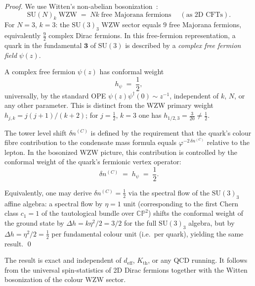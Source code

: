 \documentclass[11pt,a4paper]{article}
\theoremstyle{definition}
\theoremstyle{remark}
\newcommand{\vp}{\varphi}
\newcommand{\deff}{d_{\mathrm{eff}}}
\begin{document}
\begin{proof}
We use Witten's non-abelian bosonization~\cite{Witten1984}:
\begin{equation}
  \mathrm{SU}(N)_k\;\text{WZW}\;=\;Nk\;\text{free Majorana fermions}\;
  \quad(\text{as 2D CFTs}).
  \label{P5:eq:bosonization}
\end{equation}
For $N=3$, $k=3$: the $\mathrm{SU}(3)_3$ WZW sector equals $9$ free Majorana
fermions, equivalently $\tfrac{9}{2}$ complex Dirac fermions.  In this
free-fermion representation, a quark in the fundamental $\mathbf{3}$
of $\mathrm{SU}(3)$ is described by a \emph{complex free fermion field}
$\psi(z)$.

A complex free fermion $\psi(z)$ has conformal weight
\begin{equation}
  h_\psi \;=\; \frac{1}{2},
  \label{P5:eq:hpsi}
\end{equation}
universally, by the standard OPE $\psi(z)\psi^\dagger(0)\sim z^{-1}$,
independent of $k$, $N$, or any other parameter.
This is distinct from the WZW primary weight $h_{j,k}=j(j{+}1)/(k{+}2)$;
for $j=\tfrac{1}{2}$, $k=3$ one has $h_{1/2,3}=\tfrac{3}{20}\neq\tfrac{1}{2}$.

The tower level shift $\delta n^{(C)}$ is defined by the requirement
that the quark's colour fibre contribution to the condensate mass formula
equals $\vp^{-2\,\delta n^{(C)}}$ relative to the lepton.
In the bosonized WZW picture, this contribution is controlled by the
conformal weight of the quark's fermionic vertex operator:
\begin{equation}
  \delta n^{(C)} \;=\; h_\psi \;=\; \frac{1}{2}.
  \label{P5:eq:shift_proof}
\end{equation}

Equivalently, one may derive $\delta n^{(C)}=\tfrac{1}{2}$ via the
spectral flow of the $\mathrm{SU}(3)_3$ affine algebra: a spectral flow
by $\eta=1$ unit (corresponding to the first Chern class $c_1=1$ of the
tautological bundle over $\mathbb{CP}^2$) shifts the conformal weight
of the ground state by $\Delta h = k\eta^2/2 = 3/2$ for the full
$\mathrm{SU}(3)_3$ algebra, but by $\Delta h = \eta^2/2 = \tfrac{1}{2}$
per fundamental colour unit (i.e.\ per quark), yielding the same result.
\qed
\end{proof}

\noindent
The result is exact and independent of $\deff$, $K_{\mathrm{th}}$,
or any QCD running.  It follows from the universal spin-statistics of
2D Dirac fermions together with the Witten bosonization of the colour WZW sector.
\end{document}
